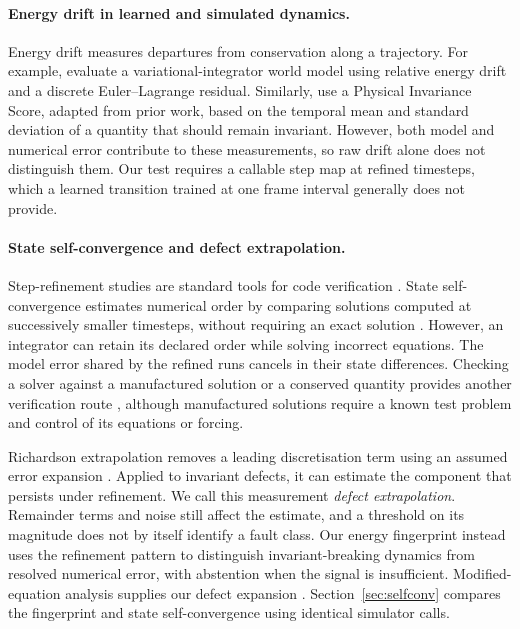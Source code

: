 \documentclass[10pt]{article}
\theoremstyle{definition}
\begin{document}
\paragraph{Energy drift in learned and simulated dynamics.}
Energy drift measures departures from conservation along a trajectory.
For example, \citet{xiao2026lawm} evaluate a
variational-integrator world model using relative energy drift and a discrete
Euler--Lagrange residual. Similarly, \citet[\S5.1 and Appendix~D.1]{yuan2026newtongen} use a Physical
Invariance Score, adapted from prior work, based on the temporal mean and
standard deviation of a quantity that should remain invariant. However, both model and numerical error contribute to these measurements,
so raw drift alone does not distinguish them. Our test requires a callable step map at refined timesteps, which a learned
transition trained at one frame interval generally does not provide.

\paragraph{State self-convergence and defect extrapolation.}
Step-refinement studies are standard tools for code verification
\citep{roache1998,oberkampf2010}. State self-convergence estimates numerical
order by comparing solutions computed at successively smaller timesteps,
without requiring an exact solution \citep{nparcconvergence}. However, an
integrator can retain its declared order while solving incorrect equations.
The model error shared by the refined runs cancels in their state
differences. Checking a solver against a manufactured solution or a conserved
quantity provides another verification route \citep{salari2000}, although
manufactured solutions require a known test problem and control of its
equations or forcing.

Richardson extrapolation removes a leading discretisation term using an
assumed error expansion \citep{richardson1927}. Applied to invariant defects,
it can estimate the component that persists under refinement. We call this
measurement \emph{defect extrapolation}. Remainder terms and noise still
affect the estimate, and a threshold on its magnitude does not by itself
identify a fault class. Our energy fingerprint instead uses the refinement
pattern to distinguish invariant-breaking dynamics from resolved numerical
error, with abstention when the signal is insufficient. Modified-equation
analysis supplies our defect expansion \citep{hairer2006geometric}.
Section~\ref{sec:selfconv} compares the fingerprint and state self-convergence
using identical simulator calls.
\end{document}
